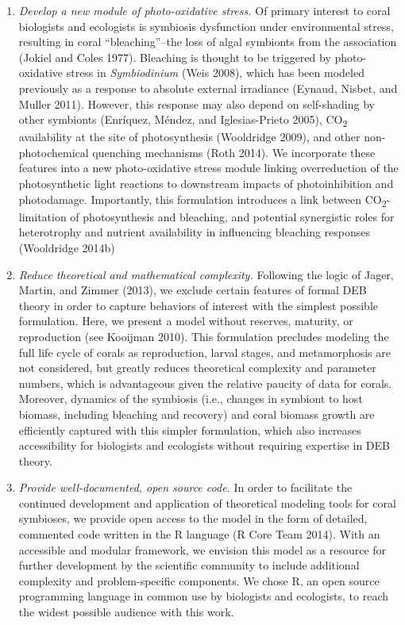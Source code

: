 \documentclass[]{elsarticle} %
\begin{document}
\begin{enumerate}
\def\labelenumi{\arabic{enumi}.}
\item
  \emph{Develop a new module of photo-oxidative stress.} Of primary
  interest to coral biologists and ecologists is symbiosis dysfunction
  under environmental stress, resulting in coral ``bleaching''--the loss
  of algal symbionts from the association (Jokiel and Coles 1977).
  Bleaching is thought to be triggered by photo-oxidative stress in
  \emph{Symbiodinium} (Weis 2008), which has been modeled previously as
  a response to absolute external irradiance (Eynaud, Nisbet, and Muller
  2011). However, this response may also depend on self-shading by other
  symbionts (Enríquez, Méndez, and Iglesias-Prieto 2005),
  CO\textsubscript{2} availability at the site of photosynthesis
  (Wooldridge 2009), and other non-photochemical quenching mechanisms
  (Roth 2014). We incorporate these features into a new photo-oxidative
  stress module linking overreduction of the photosynthetic light
  reactions to downstream impacts of photoinhibition and photodamage.
  Importantly, this formulation introduces a link between
  CO\textsubscript{2}-limitation of photosynthesis and bleaching, and
  potential synergistic roles for heterotrophy and nutrient availability
  in influencing bleaching responses (Wooldridge 2014b)
\item
  \emph{Reduce theoretical and mathematical complexity.} Following the
  logic of Jager, Martin, and Zimmer (2013), we exclude certain features
  of formal DEB theory in order to capture behaviors of interest with
  the simplest possible formulation. Here, we present a model without
  reserves, maturity, or reproduction (see Kooijman 2010). This
  formulation precludes modeling the full life cycle of corals as
  reproduction, larval stages, and metamorphosis are not considered, but
  greatly reduces theoretical complexity and parameter numbers, which is
  advantageous given the relative paucity of data for corals. Moreover,
  dynamics of the symbiosis (i.e., changes in symbiont to host biomass,
  including bleaching and recovery) and coral biomass growth are
  efficiently captured with this simpler formulation, which also
  increases accessibility for biologists and ecologists without
  requiring expertise in DEB theory.
\item
  \emph{Provide well-documented, open source code.} In order to
  facilitate the continued development and application of theoretical
  modeling tools for coral symbioses, we provide open access to the
  model in the form of detailed, commented code written in the R
  language (R Core Team 2014). With an accessible and modular framework,
  we envision this model as a resource for further development by the
  scientific community to include additional complexity and
  problem-specific components. We chose R, an open source programming
  language in common use by biologists and ecologists, to reach the
  widest possible audience with this work.
\end{enumerate}
\end{document}
